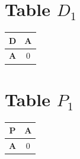 \documentclass{article}
\begin{document}
\section{Table $D_{1}$}
\begin{center}
    \begin{tabular}{|c||c|}
        \hline
        \textbf{D} & \textbf{A} \\
        \hline
        \hline
        \textbf{A}& 0 \\
        \hline
    \end{tabular}
\end{center}


\section{Table $P_{1}$}
\begin{center}
    \begin{tabular}{|c||c|}
        \hline
        \textbf{P} & \textbf{A} \\
        \hline
        \hline
        \textbf{A}& 0 \\
        \hline
    \end{tabular}
\end{center}
\end{document}

